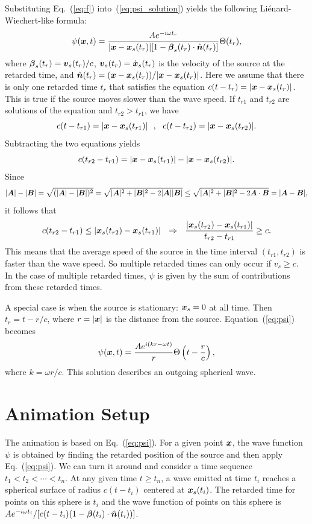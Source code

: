 \documentclass[12pt]{article}
\newcommand \beq {\begin{equation}}
\newcommand \eeq {\end{equation}}
\newcommand{\ve}[1]{\mbox{\boldmath $#1$}}
\begin{document}
Substituting Eq.~(\ref{eq:f}) into~(\ref{eq:psi_solution}) yields the following
Li{\'e}nard-Wiechert-like formula:
\beq
  \psi(\ve{x},t) = \frac{A e^{-i\omega t_r}}{|\ve{x}-\ve{x}_s(t_r)| 
[1-\ve{\beta}_s(t_r) \cdot \hat{\ve{n}}(t_r)]} \Theta(t_r) , 
\label{eq:psi}
\eeq
where $\ve{\beta}_s(t_r)=\ve{v}_s(t_r)/c$, $\ve{v}_s(t_r)=\dot{\ve{x}}_s(t_r)$ is the 
velocity of the source at the retarded time, and $\hat{\ve{n}}(t_r)=(\ve{x}-\ve{x}_s(t_r))/
|\ve{x}-\ve{x}_s(t_r)|$. Here we assume that there is only one retarded time $t_r$ 
that satisfies the equation $c(t-t_r)=|\ve{x}-\ve{x}_s(t_r)|$. This is true if 
the source moves slower than the wave speed. If $t_{r1}$ and $t_{r2}$ are solutions 
of the equation and $t_{r2}>t_{r1}$, we have 
\beq
  c(t-t_{r1})=|\ve{x}-\ve{x}_s(t_{r1})| \ \ , \ \ 
  c(t-t_{r2})=|\ve{x}-\ve{x}_s(t_{r2})| .
\eeq
Subtracting the two equations yields 
\beq
  c(t_{r2}-t_{r1})=|\ve{x}-\ve{x}_s(t_{r1})| - |\ve{x}-\ve{x}_s(t_{r2})| .
\eeq
Since 
\beq
  |\ve{A}|-|\ve{B}| = \sqrt{(|\ve{A}|-|\ve{B}|)^2} = 
  \sqrt{|\ve{A}|^2 + |\ve{B}|^2 - 2 |\ve{A}||\ve{B}|} \leq 
  \sqrt{|\ve{A}|^2 + |\ve{B}|^2 - 2 \ve{A}\cdot \ve{B}} = |\ve{A}-\ve{B}| ,
\eeq
it follows that 
\beq
  c(t_{r2}-t_{r1}) \leq |\ve{x}_s(t_{r2})-\ve{x}_s(t_{r1})| \ \ \Rightarrow \ \ 
  \frac{|\ve{x}_s(t_{r2})-\ve{x}_s(t_{r1})|}{t_{r2}-t_{r1}} \geq c .
\eeq
This means that the average speed of the source in the time interval $(t_{r1},t_{r2})$ 
is faster than the wave speed. So multiple retarded times can only occur if $v_s \geq c$. 
In the case of multiple retarded times, $\psi$ is given by the sum of contributions 
from these retarded times.

A special case is when the source is stationary: $\ve{x}_s=0$ at all time. 
Then $t_r=t-r/c$, where $r=|\ve{x}|$ is the distance from the source. Equation~(\ref{eq:psi}) 
becomes 
\beq
  \psi(\ve{x},t) = \frac{A e^{i(kr-\omega t)}}{r} \Theta \left(t-\frac{r}{c}\right) ,
\eeq
where $k=\omega r/c$. This solution describes an outgoing spherical wave.

\section{Animation Setup}

The animation is based on Eq.~(\ref{eq:psi}). For a given point $\ve{x}$, the 
wave function $\psi$ is obtained by finding the retarded position of the source and 
then apply Eq.~(\ref{eq:psi}). We can turn it around and consider a time
sequence $t_1<t_2<\cdots < t_n$. At any given time $t \geq t_n$, a wave emitted at time
$t_i$ reaches a spherical surface of radius $c(t-t_i)$ centered at $\ve{x}_s(t_i)$. 
The retarded time for points on this sphere is $t_i$ and the wave function of 
points on this 
sphere is $A e^{-i\omega t_i}/[c(t-t_i) (1-\ve{\beta}(t_i)\cdot \hat{\ve{n}}(t_i))]$. 
\end{document}
